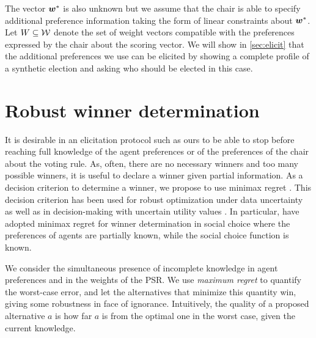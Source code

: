 \documentclass{article}
\begin{document}
The vector $\bm{w}^*$  is also unknown but we assume that the chair is able to specify additional preference information taking the form of linear constraints about $\bm{w}^*$. Let $W \subseteq \mathcal{W}$ denote the set of weight vectors compatible with the preferences expressed by the chair about the scoring vector.
We will show in \cref{sec:elicit} that the additional preferences we use can be elicited by showing a complete profile of a synthetic election and asking who should be elected in this case.

\section{Robust winner determination}
\label{sec:mmr}
It is desirable in an elicitation protocol such as ours to be able to stop before reaching full knowledge of the agent preferences or of the preferences of the chair about the voting rule. As, often, there are no necessary winners and too many possible winners, it is useful to declare a winner given partial information.
As a decision criterion to determine a winner, we propose to use minimax regret \citep{Savage1954}. 
This decision criterion has been used for robust optimization under data uncertainty \citep{Kouvelis1997} as well as in decision-making with uncertain utility values \citep{Salo2001,Boutilier2006}.
In particular, \citet{Lu2011} have adopted minimax regret for winner determination in social choice where
the preferences of agents are partially known, while the social choice function is known.

We consider the simultaneous presence of incomplete knowledge in agent preferences and in the weights of the PSR.
We use \emph{maximum regret} to quantify the worst-case error, and let the alternatives that minimize this quantity win, giving some robustness in face of ignorance.
Intuitively, the quality of a proposed alternative $a$ is how far $a$ is from the optimal one in the worst case, given the current knowledge.
\end{document}
